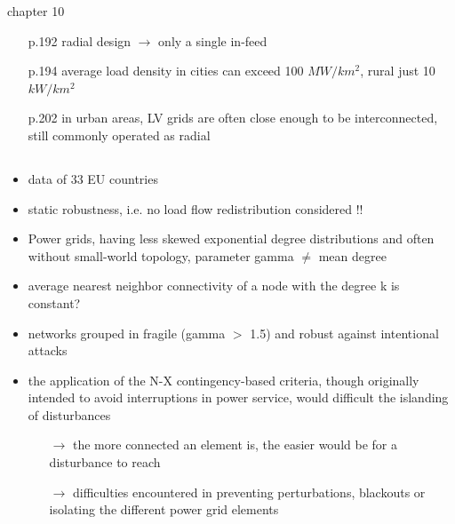 \documentclass[paper=a4, fontsize=12pt]{article}
\begin{document}
chapter 10

\begin{itemize}
\item[p.192] radial design $\rightarrow$ only a single in-feed
\item[p.194] average load density in cities can exceed 100 $MW/km^2$, rural just 10 $kW/km^2$
\item[p.202] in urban areas, LV grids are often close enough to be interconnected, still commonly operated as radial
\end{itemize}

\subsection*{\citeauthor{Rosas-Casals2007} \cite{Rosas-Casals2007}}

\begin{itemize}
\item data of 33 EU countries 
\item static robustness, i.e. no load flow redistribution considered !!

\item Power grids, having less skewed exponential degree distributions and often without small-world topology, parameter gamma $\neq$ mean degree 
\item average nearest neighbor connectivity of a node with the degree k is constant? 

\item networks grouped in fragile (gamma $>$ 1.5) and robust against intentional attacks
\item the application of the N-X contingency-based criteria, though originally intended to avoid interruptions in power service, would difficult the islanding of disturbances 
\begin{itemize}
\item[$\rightarrow$ ] the more connected an element is, the easier would be for a disturbance to reach
\item[$\rightarrow$ ] difficulties encountered in preventing perturbations, blackouts or isolating the different power grid elements
\end{itemize}
	
\end{itemize}

\subsection*{ \citeauthor{Rosas-Casals2009} \cite{Rosas-Casals2009} }
\end{document}
